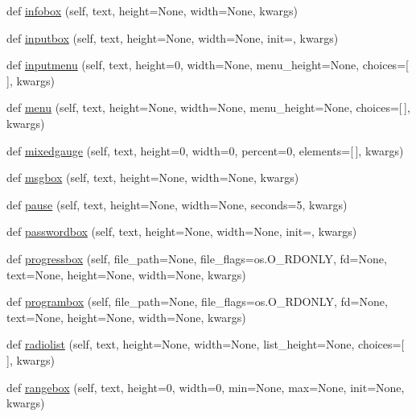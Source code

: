 \begin{DoxyCompactItemize}
\item 
def \hyperlink{class_libraries_1_1dialog_1_1_dialog_a918bd8c1d5f802c6012e05278866a538}{infobox} (self, text, height=None, width=None, kwargs)
\item 
def \hyperlink{class_libraries_1_1dialog_1_1_dialog_a71b9fe473cb4f46ae7cc53710870f001}{inputbox} (self, text, height=None, width=None, init=\textquotesingle{}\textquotesingle{}, kwargs)
\item 
def \hyperlink{class_libraries_1_1dialog_1_1_dialog_a6053e320412d1328b8f92e5eabec7b28}{inputmenu} (self, text, height=0, width=None, menu\+\_\+height=None, choices=\mbox{[}$\,$\mbox{]}, kwargs)
\item 
def \hyperlink{class_libraries_1_1dialog_1_1_dialog_a87432e46a17e8cb74e1ac2fe31dd9dc0}{menu} (self, text, height=None, width=None, menu\+\_\+height=None, choices=\mbox{[}$\,$\mbox{]}, kwargs)
\item 
def \hyperlink{class_libraries_1_1dialog_1_1_dialog_aa171080540d60b6b4fbf57838628684b}{mixedgauge} (self, text, height=0, width=0, percent=0, elements=\mbox{[}$\,$\mbox{]}, kwargs)
\item 
def \hyperlink{class_libraries_1_1dialog_1_1_dialog_a9824d5fd14e5fe7c3a17adff7dc80d11}{msgbox} (self, text, height=None, width=None, kwargs)
\item 
def \hyperlink{class_libraries_1_1dialog_1_1_dialog_a66e03a885375768bc62b70ddec7f065c}{pause} (self, text, height=None, width=None, seconds=5, kwargs)
\item 
def \hyperlink{class_libraries_1_1dialog_1_1_dialog_ad7f3b459e362ab768bf0ee61360d68a1}{passwordbox} (self, text, height=None, width=None, init=\textquotesingle{}\textquotesingle{}, kwargs)
\item 
def \hyperlink{class_libraries_1_1dialog_1_1_dialog_a8cc853eb088228c593c2d5cc155a78f9}{progressbox} (self, file\+\_\+path=None, file\+\_\+flags=os.\+O\+\_\+\+R\+D\+O\+N\+LY, fd=None, text=None, height=None, width=None, kwargs)
\item 
def \hyperlink{class_libraries_1_1dialog_1_1_dialog_afc9ecbe7531557b50d8bd88f5188272d}{programbox} (self, file\+\_\+path=None, file\+\_\+flags=os.\+O\+\_\+\+R\+D\+O\+N\+LY, fd=None, text=None, height=None, width=None, kwargs)
\item 
def \hyperlink{class_libraries_1_1dialog_1_1_dialog_a0749f33cdc3150d47b2f15043b845c19}{radiolist} (self, text, height=None, width=None, list\+\_\+height=None, choices=\mbox{[}$\,$\mbox{]}, kwargs)
\item 
def \hyperlink{class_libraries_1_1dialog_1_1_dialog_a4f7686ffbeb783a34f1ca6a916a828c0}{rangebox} (self, text, height=0, width=0, min=None, max=None, init=None, kwargs)

\end{DoxyCompactItemize}
